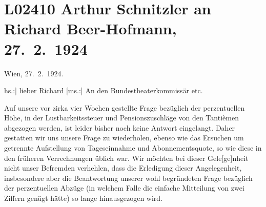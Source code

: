 

\section[Arthur Schnitzler an Richard Beer-Hofmann, 27. 2. 1924]{L02410 Arthur Schnitzler an Richard Beer-Hofmann, 27. 2. 1924}
\nopagebreak{}
\rehead{ }\normalsize\beginnumbering{}
\toendnotes[C]{\smallbreak\pagebreak[2]}
\toendnotes[C]{\smallbreak}
\toendnotes[C]{\smallbreak}
\pstart
           \raggedleft{}{\pb}Wien, 27. 2. 1924.\pend
           
\pstart\center{}{[}hs.:{]} lieber Richard\pend\vspace{0.5em}
\pstart
           {[}ms.:{]} An den Bundestheaterkommissär etc.\pend
           
\pstart
           Auf unsere vor zirka vier Wochen gestellte Frage bezüglich der perzentuellen Höhe, in
               der Lustbarkeitssteuer und Pensionszuschläge von den Tantièmen abgezogen werden, ist
               leider bisher noch keine Antwort eingelangt. Daher gestatten wir uns unsere Frage zu
               wiederholen, ebenso wie das Ersuchen um getrennte Aufstellung von Tageseinnahme und
               Abonnementsquote, so wie diese in den früheren Verrechnungen üblich war. Wir möchten
               bei dieser Gele{[}ge{]}nheit nicht unser Befremden verhehlen, dass die
               Erledigung dieser Angelegenheit, insbesondere aber die Beantwortung unserer wohl
               begründeten Frage bezüglich der perzentuellen Abzüge
               (in welchem Falle die einfache Mitteilung von zwei Ziffern genügt hätte) so lange
               hinausgezogen wird.\pend
           
